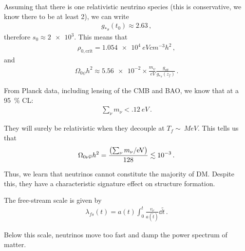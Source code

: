 \documentclass[main.tex]{subfiles}
\begin{document}
Assuming that there is one relativistic neutrino species (this is conservative, we know there to be at least 2), we can write 
%
\begin{align}
g_{*s} (t_0) \approx \num{2.63}
\,,
\end{align}
%
therefore \(s_0  \approx \num{2e3}\). 
This means that 
%
\begin{align}
\rho_{0, \text{crit}} = \SI{1.054e4}{eV cm^{-3}} h^2
\,,
\end{align}
%
and 
%
\begin{align}
\Omega_{0 \psi } h^2 \approx \num{5.56e-2} \times \frac{m_\psi }{\SI{}{eV}} \frac{g _{\text{eff}}}{g_{*s} (z_f)}
\,.
\end{align}

From Planck data, including lensing of the CMB and BAO, we know that at a \SI{95}{\percent} CL: 
%
\begin{align}
\sum _{\nu } m_\nu < \SI{.12}{eV}
\,.
\end{align}

They will surely be relativistic when they decouple at \(T_f \sim \SI{}{MeV}\). 
This tells us that 
%
\begin{align}
\Omega_{0 \nu  \overline{\nu}} h^2 = \frac{\qty(\sum _{\nu } m_\nu  / \SI{}{eV})}{128} \lesssim \num{e-3}
\,.
\end{align}

Thus, we learn that neutrinos cannot constitute the majority of DM. 
Despite this, they have a characteristic signature effect on structure formation. 

The free-stream scale is given by 
%
\begin{align}
\lambda_{fs}(t) = a(t) \int_0^{t} \frac{v_\nu }{a(\widetilde{t})} \dd{\widetilde{t}}
\,.
\end{align}

Below this scale, neutrinos move too fast and damp the power spectrum of matter. 
\end{document}
